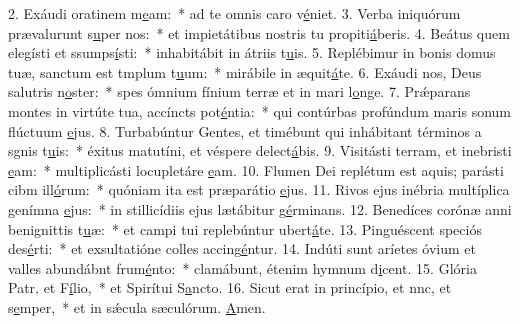 2. Exáudi oratinem m\uline{e}am:~* ad te omnis caro v\uline{é}niet.
3. Verba iniquórum prævalurunt s\uline{u}per nos:~* et impietátibus nostris tu propiti\uline{á}beris.
4. Beátus quem elegísti et ssumps\uline{í}sti:~* inhabitábit in átriis t\uline{u}is.
5. Replébimur in bonis domus tuæ, sanctum est tmplum t\uline{u}um:~* mirábile in æquit\uline{á}te.
6. Exáudi nos, Deus salutris n\uline{o}ster:~* spes ómnium fínium terræ et in mari l\uline{o}nge.
7. Prǽparans montes in virtúte tua, accíncts pot\uline{é}ntia:~* qui contúrbas profúndum maris sonum flúctuum \uline{e}jus.
8. Turbabúntur Gentes, et timébunt qui inhábitant términos a sgnis t\uline{u}is:~* éxitus matutíni, et véspere delect\uline{á}bis.
9. Visitásti terram, et inebristi \uline{e}am:~* multiplicásti locupletáre \uline{e}am.
10. Flumen Dei replétum est aquis; parásti cibm ill\uline{ó}rum:~* quóniam ita est præparátio \uline{e}jus.
11. Rivos ejus inébria multíplica genímna \uline{e}jus:~* in stillicídiis ejus lætábitur g\uline{é}rminans.
12. Benedíces corónæ anni benignittis t\uline{u}æ:~* et campi tui replebúntur ubert\uline{á}te.
13. Pinguéscent speciós des\uline{é}rti:~* et exsultatióne colles accing\uline{é}ntur.
14. Indúti sunt aríetes óvium et valles abundábnt frum\uline{é}nto:~* clamábunt, étenim hymnum d\uline{i}cent.
15. Glória Patr, et F\uline{í}lio,~* et Spirítui S\uline{a}ncto.
16. Sicut erat in princípio, et nnc, et s\uline{e}mper,~* et in sǽcula sæculórum. \uline{A}men.
